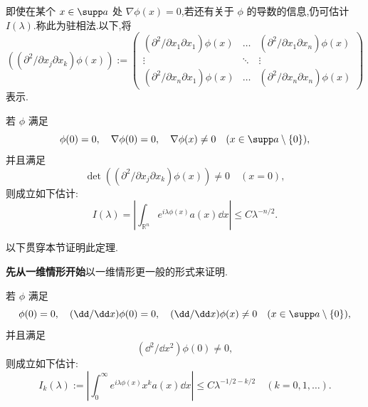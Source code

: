 即使在某个 $x \in \supp a$ 处 $\nabla\phi(x) = 0$,若还有关于 $\phi$ 的导数的信息,仍可估计 $I(\lambda)$.称此为驻相法.以下,将
\begin{equation*}
\left((\partial^{2}/\partial x_{j}\partial x_{k})\phi(x)\right) := \left(\begin{array}{ccc}
(\partial^{2}/\partial x_{1}\partial x_{1})\phi(x) & \ldots & (\partial^{2}/\partial x_{1}\partial x_{n})\phi(x) \\
\vdots & \ddots & \vdots \\
(\partial^{2}/\partial x_{n}\partial x_{1})\phi(x) & \ldots & (\partial^{2}/\partial x_{n}\partial x_{n})\phi(x)
\end{array}\right)
\end{equation*}
表示.

\begin{theorem}\label{thm:4.4.2}
若 $\phi$ 满足
\begin{equation*}
\phi(0) = 0, \quad \nabla\phi(0) = 0, \quad \nabla\phi(x) \neq 0 \quad (x \in \supp a \setminus \{0\}),
\end{equation*}
并且满足
\begin{equation*}
\det\left((\partial^{2}/\partial x_{j}\partial x_{k})\phi(x)\right) \neq 0 \quad (x = 0),
\end{equation*}
则成立如下估计:
\begin{equation}
I(\lambda) = \left|\int_{\mathbb{R}^{n}}e^{i\lambda\phi(x)}a(x)\dd x\right| \leq C\lambda^{-n/2}.\tag{4.4.2}
\label{eq:4.4.2}\end{equation}

以下贯穿本节证明此定理.
\end{theorem}

\noindent\textbf{先从一维情形开始}\quad 以一维情形更一般的形式来证明.

\begin{lemma}\label{lem:4.4.3}
若 $\phi$ 满足
\begin{equation*}
\phi(0) = 0, \quad (\dd/\dd x)\phi(0) = 0, \quad (\dd/\dd x)\phi(x) \neq 0 \quad (x \in \supp a \setminus \{0\}),
\end{equation*}
并且满足
\begin{equation*}
(\dd^{2}/\dd x^{2})\phi(0) \neq 0,
\end{equation*}
则成立如下估计:
\begin{equation}
I_{k}(\lambda) := \left|\int_{0}^{\infty}e^{i\lambda\phi(x)}x^{k}a(x)\dd x\right| \leq C\lambda^{-1/2-k/2} \quad (k = 0, 1, \ldots).\tag{4.4.3}
\label{eq:4.4.3}\end{equation}
\end{lemma}

